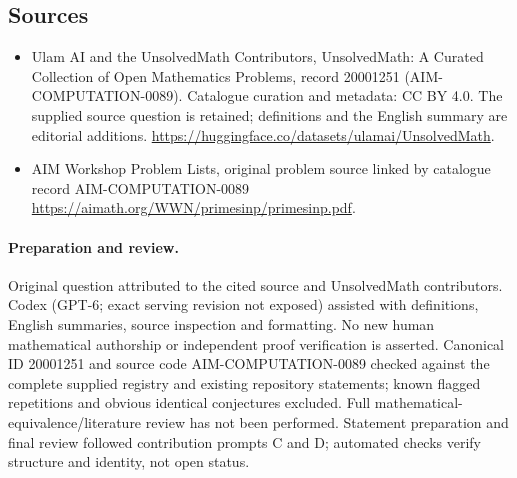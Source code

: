 \documentclass[11pt]{article}
\begin{document}
\subsection{Sources}
\begin{itemize}
\item[\hypertarget{source:20001251:1}{S1}] Ulam AI and the UnsolvedMath Contributors, UnsolvedMath: A Curated Collection of Open Mathematics Problems, record 20001251 (AIM-COMPUTATION-0089). Catalogue curation and metadata: CC BY 4.0. The supplied source question is retained; definitions and the English summary are editorial additions.
\url{https://huggingface.co/datasets/ulamai/UnsolvedMath}.
\item[\hypertarget{source:20001251:2}{S2}] AIM Workshop Problem Lists, original problem source linked by catalogue record AIM-COMPUTATION-0089
\url{https://aimath.org/WWN/primesinp/primesinp.pdf}.
\end{itemize}
\paragraph{Preparation and review.}
Original question attributed to the cited source and UnsolvedMath contributors. Codex (GPT-6; exact serving revision not exposed) assisted with definitions, English summaries, source inspection and formatting. No new human mathematical authorship or independent proof verification is asserted. Canonical ID 20001251 and source code AIM-COMPUTATION-0089 checked against the complete supplied registry and existing repository statements; known flagged repetitions and obvious identical conjectures excluded. Full mathematical-equivalence/literature review has not been performed. Statement preparation and final review followed contribution prompts C and D; automated checks verify structure and identity, not open status.
\label{end:20001251}
\end{document}
